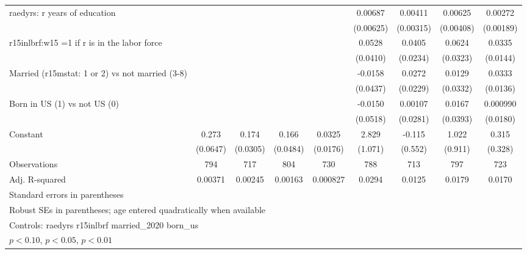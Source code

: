 \begin{table}[htbp]
\begin{tabular}{l*{8}{c}}
\addlinespace
raedyrs: r years of education&                  &                  &                  &                  &  0.00687         &  0.00411         &  0.00625         &  0.00272         \\
                &                  &                  &                  &                  &(0.00625)         &(0.00315)         &(0.00408)         &(0.00189)         \\
\addlinespace
r15inlbrf:w15 =1 if r is in the labor force&                  &                  &                  &                  &   0.0528         &   0.0405\sym{*}  &   0.0624\sym{*}  &   0.0335\sym{**} \\
                &                  &                  &                  &                  & (0.0410)         & (0.0234)         & (0.0323)         & (0.0144)         \\
\addlinespace
Married (r15mstat: 1 or 2) vs not married (3-8)&                  &                  &                  &                  &  -0.0158         &   0.0272         &   0.0129         &   0.0333\sym{**} \\
                &                  &                  &                  &                  & (0.0437)         & (0.0229)         & (0.0332)         & (0.0136)         \\
\addlinespace
Born in US (1) vs not US (0)&                  &                  &                  &                  &  -0.0150         &  0.00107         &   0.0167         & 0.000990         \\
                &                  &                  &                  &                  & (0.0518)         & (0.0281)         & (0.0393)         & (0.0180)         \\
\addlinespace
Constant        &    0.273\sym{***}&    0.174\sym{***}&    0.166\sym{***}&   0.0325\sym{*}  &    2.829\sym{***}&   -0.115         &    1.022         &    0.315         \\
                & (0.0647)         & (0.0305)         & (0.0484)         & (0.0176)         &  (1.071)         &  (0.552)         &  (0.911)         &  (0.328)         \\
\midrule
Observations    &      794         &      717         &      804         &      730         &      788         &      713         &      797         &      723         \\
Adj. R-squared  &  0.00371         &  0.00245         &  0.00163         & 0.000827         &   0.0294         &   0.0125         &   0.0179         &   0.0170         \\
\bottomrule
\multicolumn{9}{l}{\footnotesize Standard errors in parentheses}\\
\multicolumn{9}{l}{\footnotesize Robust SEs in parentheses; age entered quadratically when available}\\
\multicolumn{9}{l}{\footnotesize Controls:  raedyrs r15inlbrf married\_2020 born\_us}\\
\multicolumn{9}{l}{\footnotesize \sym{*} \(p<0.10\), \sym{**} \(p<0.05\), \sym{***} \(p<0.01\)}\\
\end{tabular}
\end{table}
